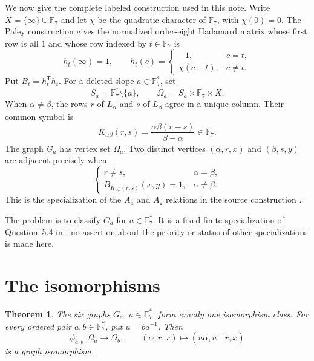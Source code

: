 \documentclass[11pt]{article}
\newtheorem{theorem}{Theorem}
\newcommand{\F}{\mathbb F}
\begin{document}
We now give the complete labeled construction used in this note.  Write
$X=\{\infty\}\cup\F_7$ and let $\chi$ be the quadratic character of $\F_7$,
with $\chi(0)=0$.  The Paley construction \cite{Paley1933} gives the
normalized order-eight Hadamard matrix whose first row is all $1$ and whose
row indexed by $t\in\F_7$ is
\[
 h_t(\infty)=1,
 \qquad
 h_t(c)=
 \begin{cases}
 -1,&c=t,\\
 \chi(c-t),&c\ne t.
 \end{cases}
\]
Put $B_t=h_t^{\mathsf T}h_t$.  For a deleted slope $a\in\F_7^*$, set
\[
 S_a=\F_7^*\setminus\{a\},
 \qquad
 \Omega_a=S_a\times\F_7\times X.
\]
When $\alpha\ne\beta$, the rows $r$ of $L_\alpha$ and $s$ of $L_\beta$
agree in a unique column.  Their common symbol is
\begin{equation}\label{eq:K}
 K_{\alpha\beta}(r,s)
   =\frac{\alpha\beta(r-s)}{\beta-\alpha}\in\F_7.
\end{equation}
The graph $G_a$ has vertex set $\Omega_a$.  Two distinct vertices
$(\alpha,r,x)$ and $(\beta,s,y)$ are adjacent precisely when
\begin{equation}\label{eq:adjacency}
 \begin{cases}
 r\ne s, & \alpha=\beta,\\
 B_{K_{\alpha\beta}(r,s)}(x,y)=1, & \alpha\ne\beta.
 \end{cases}
\end{equation}
This is the specialization of the $A_4$ and $A_2$ relations in the source
construction \cite{GreavesTan2026}.

The problem is to classify $G_a$ for $a\in\F_7^*$.  It is a fixed finite
specialization of Question~5.4 in \cite{GreavesTan2026}; no assertion about
the priority or status of other specializations is made here.

\section{The isomorphisms}

\begin{theorem}\label{thm:classification}
The six graphs $G_a$, $a\in\F_7^*$, form exactly one isomorphism class.  For
every ordered pair $a,b\in\F_7^*$, put $u=ba^{-1}$.  Then
\begin{equation}\label{eq:phi}
 \phi_{a,b}:\Omega_a\longrightarrow\Omega_b,
 \qquad
 (\alpha,r,x)\longmapsto(u\alpha,u^{-1}r,x)
\end{equation}
is a graph isomorphism.
\end{theorem}
\end{document}
